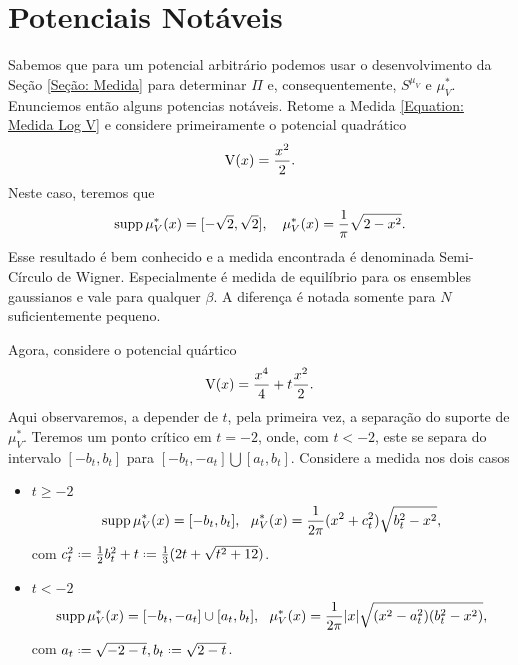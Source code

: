 \section{Potenciais Notáveis}
\label{Section: Potencias}

 Sabemos que para um potencial arbitrário podemos usar o desenvolvimento da Seção \ref{Seção: Medida}  para determinar $\Pi$ e, consequentemente, $S^{\mu_V}$ e $\mu^{*}_{V}$. Enunciemos então alguns potencias notáveis. Retome a Medida \eqref{Equation: Medida Log V} e considere primeiramente o potencial quadrático $$\operatorname{V}(x) = \frac{x^2}{2}.$$ Neste caso, teremos que
\begin{equation}
	 \operatorname{supp}{\mu^*_V(x)} = [-\sqrt{2}, \sqrt{2}], \ \ \ \mu^*_V(x) = \frac{1}{\pi} \sqrt{2 - x^2}.
	 \label{Equação: Quadrático}
\end{equation}
Esse resultado é bem conhecido e a medida encontrada é denominada Semi-Círculo de Wigner. Especialmente é medida de equilíbrio para os ensembles gaussianos e vale para qualquer $\beta$. A diferença é notada somente para $N$ suficientemente pequeno.

Agora, considere o potencial quártico $$\operatorname{V}(x) = \frac{x^4}{4} + t \frac{x^2}{2}.$$ Aqui observaremos, a depender de $t$, pela primeira vez, a separação do suporte de $\mu^*_V$. Teremos um ponto crítico em $t=-2$, onde, com $t < -2$, este se separa do intervalo $[-b_t, b_t]$ para $[-b_t, -a_t] \bigcup [a_t, b_t]$. Considere a medida nos dois casos
\begin{itemize}
	\item \(t \geq -2\)
	\begin{equation}
	\supp \mu^*_V(x) = [-b_t, b_t], \ \ \mu^*_V(x) = \frac{1}{2\pi} (x^2 + c_t^2) \sqrt{b_t^2 - x^2},\label{Equação: Quartico +}
	\end{equation}
	com $c_t^2 \deff\frac{1}{2} b_t^2 + t \deff \frac{1}{3} (2t + \sqrt{t^2 + 12})$.
	\item \(t < -2\)
	\begin{equation}
	\operatorname{supp} \mu^*_V(x) = [-b_t, -a_t] \cup [a_t, b_t], \ \ \mu^*_V(x) = \frac{1}{2\pi} |x| \sqrt{(x^2 - a_t^2)(b_t^2 - x^2)},
	\label{Equação: Quartico -}
	\end{equation}
	com $ a_t \deff \sqrt{-2-t}, b_t \deff \sqrt{2-t}$.
\end{itemize}


